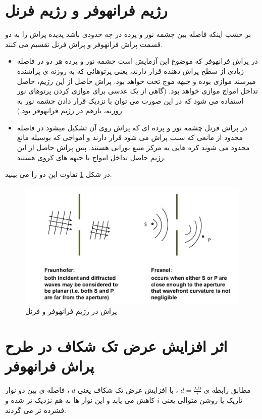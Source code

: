 \documentclass{article}
\begin{document}
\section{رژیم فرانهوفر و رژیم فرنل}
بر حسب اينکه فاصله بين چشمه نور و پرده در چه حدودی باشد پديده پراش را به دو
قسمت پراش فرانهوفر و پراش فرنل تقسيم می کنند. 
\begin{itemize}
	\item
	در پراش فرانهوفر که موضوع اين آزمايش است چشمه نور
	و پرده هر دو در فاصله زيادی از سطح پراش دهنده قرار دارند، يعنی پرتوهائی که به روزنه ی پراشنده میرسند
	موازی بوده و جبهه موج تخت خواهد بود. پراش حاصل از این رژیم، حاصل تداخل امواج موازی خواهد بود. (گاهی از یک عدسی برای موازی کردن پرتوهای نور استفاده می شود که در این صورت می توان با نزدیک قرار دادن چشمه نور به روزنه، بازهم در رژیم فرانهوفر بود.)
	\item
	 در پراش فرنل چشمه
	نور و پرده ای که پراش روی آن تشکيل میشود در فاصله محدود از مانعی که سبب پراش می شود قرار
	دارند و امواجی که بوسيله مانع محدود می شوند کره هایی به مرکز منبع نورانی هستند. پس پراش حاصل از این رژیم حاصل تداخل امواج با جبهه های کروی هستند.
\end{itemize}
در شکل 
\ref{Fig1}
تفاوت این دو را می بینید.
\begin{figure}[h]
	\centering
	\includegraphics[scale=0.5]{1.jpg}
	\caption{پراش در رژیم فرانهوفر و فرنل}
	\label{Fig1}
\end{figure}
\section{ اثر افزایش عرض تک شکاف در طرح پراش فرانهوفر}
مطابق رابطه ی 
$d = \frac{\lambda D}{i}$
، با افزایش عرض تک شکاف یعنی 
$d$
، 
فاصله ی بین دو نوار تاریک یا روشن متوالی یعنی 
$i$
 کاهش می یابد و این نوار ها به هم نزدیک تر شده و فشرده تر می گردند.
\end{document}
